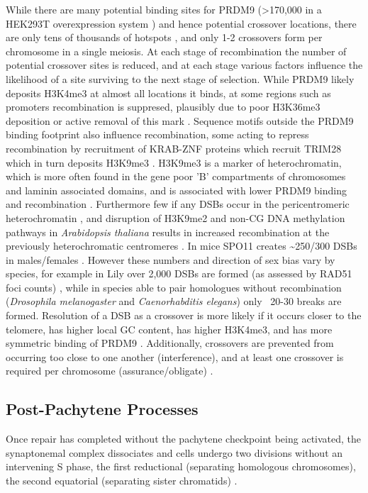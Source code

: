 While there are many potential binding sites for PRDM9 (>170,000 in a HEK293T overexpression system \parencite{Altemose2017map}) and hence potential crossover locations, there are only tens of thousands of hotspots \parencite{Myers2005FineScale, Pratto2014Recombination}, and only 1-2 crossovers form per chromosome in a single meiosis.
At each stage of recombination the number of potential crossover sites is reduced, and at each stage various factors influence the likelihood of a site surviving to the next stage of selection.
While PRDM9 likely deposits H3K4me3 at almost all locations it binds, at some regions such as promoters recombination is suppresed, plausibly due to poor H3K36me3 deposition or active removal of this mark \parencite{Altemose2017map}.
Sequence motifs outside the PRDM9 binding footprint also influence recombination, some acting to repress recombination by recruitment of KRAB-ZNF proteins which recruit TRIM28 which in turn deposits H3K9me3 \parencite{Altemose2017map}.
H3K9me3 is a marker of heterochromatin, which is more often found in the gene poor 'B' compartments of chromosomes and laminin associated domains, and is associated with lower PRDM9 binding and recombination \parencite{Walker2015Affinityseq,Patel2019Dynamic,Yamada2017Genomic}.
Furthermore few if any DSBs occur in the pericentromeric heterochromatin \parencite{Verver2013Role}, and disruption of H3K9me2 and non-CG DNA methylation pathways in \textit{Arabidopsis thaliana} results in increased recombination at the previously heterochromatic centromeres \parencite{Underwood2018Epigenetic}.
In mice SPO11 creates \textasciitilde250/300 DSBs in males/females \parencite{Baudat2007Regulating}.
However these numbers and direction of sex bias vary by species, for example in Lily over 2,000 DSBs are formed (as assessed by RAD51 foci counts) \parencite{Terasawa1995Localization}, while in species able to pair homologues without recombination (\textit{Drosophila melanogaster} and \textit{Caenorhabditis elegans}) only ~20-30 breaks are formed.
Resolution of a DSB as a crossover is more likely if it occurs closer to the telomere, has higher local GC content, has higher H3K4me3, and has more symmetric binding of PRDM9 \parencite{Hinch2019Factors}.
Additionally, crossovers are prevented from occurring too close to one another (interference), and at least one crossover is required per chromosome (assurance/obligate) \parencite{Fledel-Alon2009BroadScale, Hunter2015Meiotic, Otto2019Crossover}.



\subsection{Post-Pachytene Processes}
Once repair has completed without the pachytene checkpoint being activated, the synaptonemal complex dissociates and cells undergo two divisions without an intervening S phase, the first reductional (separating homologous chromosomes), the second equatorial (separating sister chromatids) \parencite{Roeder2000pachytene, Subramanian2014Meiotic, Watanabe2012Geometry}.

